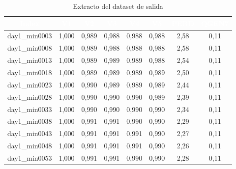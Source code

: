 \begin{table}[htp]
	\centering
	\renewcommand{\arraystretch}{1.3}
	\begin{tabular}{ | c | c | c | c | c | c | c | c | }
		\hline
		\rowcolor[HTML]{5B9BD5} 
		\textcolor{white}{\textbf{Index}} & \textcolor{white}{\textbf{V1}} & \textcolor{white}{\textbf{V2}} & \textcolor{white}{\textbf{V3}} & \textcolor{white}{\textbf{V4}} & \textcolor{white}{\textbf{V5}} & \textcolor{white}{\textbf{PERD}} & \textcolor{white}{\textbf{QGEN7}} \\
		\hline
		
		day1\_min0003 & 1,000 & 0,989 & 0,988 & 0,988 & 0,988 & 2,58 & 0,11 \\
		\hline
		day1\_min0008 & 1,000 & 0,989 & 0,988 & 0,988 & 0,988 & 2,58 & 0,11 \\
		\hline
		day1\_min0013 & 1,000 & 0,989 & 0,989 & 0,989 & 0,988 & 2,54 & 0,11 \\
		\hline
		day1\_min0018 & 1,000 & 0,989 & 0,989 & 0,989 & 0,989 & 2,50 & 0,11 \\
		\hline
		day1\_min0023 & 1,000 & 0,990 & 0,989 & 0,989 & 0,989 & 2,44 & 0,11 \\
		\hline
		day1\_min0028 & 1,000 & 0,990 & 0,990 & 0,990 & 0,989 & 2,39 & 0,11 \\
		\hline
		day1\_min0033 & 1,000 & 0,990 & 0,990 & 0,990 & 0,990 & 2,34 & 0,11 \\
		\hline
		day1\_min0038 & 1,000 & 0,991 & 0,991 & 0,990 & 0,990 & 2,29 & 0,11 \\
		\hline
		day1\_min0043 & 1,000 & 0,991 & 0,991 & 0,991 & 0,990 & 2,27 & 0,11 \\
		\hline
		day1\_min0048 & 1,000 & 0,991 & 0,991 & 0,991 & 0,990 & 2,26 & 0,11 \\
		\hline
		day1\_min0053 & 1,000 & 0,991 & 0,991 & 0,990 & 0,990 & 2,28 & 0,11 \\
		\hline
		
	\end{tabular}
	
	\caption{Extracto del dataset de salida}
	\label{table:dataset-2}
\end{table}